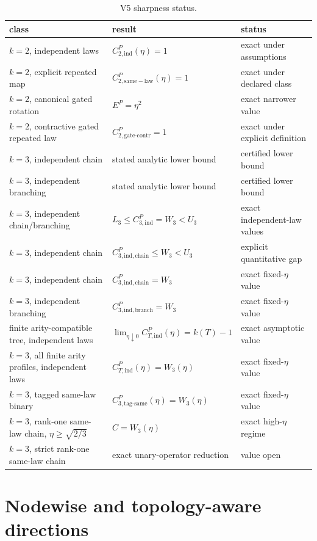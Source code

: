 \documentclass[11pt]{amsart}
\theoremstyle{definition}
\theoremstyle{remark}
\begin{document}
\begin{table}[t]
\centering
\small
\caption{V5 sharpness status.}
\begin{tabularx}{.96\textwidth}{@{}lXl@{}}
\toprule
class & result & status\\
\midrule
$k=2$, independent laws & $C_{2,\mathrm{ind}}^P(\eta)=1$ & exact under assumptions\\
$k=2$, explicit repeated map & $C_{2,\mathrm{same-law}}^P(\eta)=1$ & exact under declared class\\
$k=2$, canonical gated rotation & $E^P=\eta^2$ & exact narrower value\\
$k=2$, contractive gated repeated law & $C_{2,\mathrm{gate\text{-}contr}}^P=1$ & exact under explicit definition\\
$k=3$, independent chain & stated analytic lower bound & certified lower bound\\
$k=3$, independent branching & stated analytic lower bound & certified lower bound\\
$k=3$, independent chain/branching & $L_3\le C_{3,\mathrm{ind}}^P=W_3<U_3$ & exact independent-law values\\
$k=3$, independent chain & $C_{3,\mathrm{ind},\mathrm{chain}}^P\le W_3<U_3$ & explicit quantitative gap\\
$k=3$, independent chain & $C_{3,\mathrm{ind},\mathrm{chain}}^P=W_3$ & exact fixed-$\eta$ value\\
$k=3$, independent branching & $C_{3,\mathrm{ind},\mathrm{branch}}^P=W_3$ & exact fixed-$\eta$ value\\
finite arity-compatible tree, independent laws & $\lim_{\eta\downarrow0}C_{T,\mathrm{ind}}^P(\eta)=k(T)-1$ & exact asymptotic value\\
$k=3$, all finite arity profiles, independent laws & $C_{T,\mathrm{ind}}^P(\eta)=W_3(\eta)$ & exact fixed-$\eta$ value\\
$k=3$, tagged same-law binary & $C_{3,\mathrm{tag\text{-}same}}^P(\eta)=W_3(\eta)$ & exact fixed-$\eta$ value\\
$k=3$, rank-one same-law chain, $\eta\ge\sqrt{2/3}$ & $C=W_3(\eta)$ & exact high-$\eta$ regime\\
$k=3$, strict rank-one same-law chain & exact unary-operator reduction & value open\\
\bottomrule
\end{tabularx}
\end{table}

\section{Nodewise and topology-aware directions}
\end{document}
